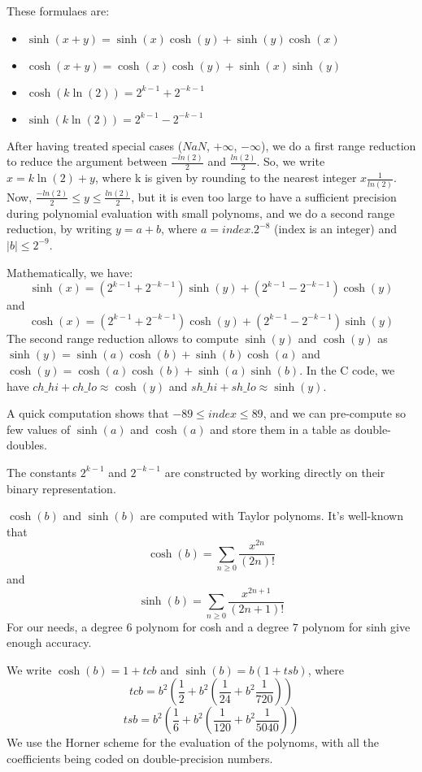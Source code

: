 These formulaes are:
\begin{itemize}
\item  $\sinh(x + y) = \sinh(x)  \cosh(y) + \sinh(y)  \cosh(x)$
\item  $\cosh(x + y) = \cosh(x)  \cosh(y) + \sinh(x)  \sinh(y)$
\item  $\cosh(k\ln(2)) = 2^{k-1} + 2^{-k-1}$
\item   $\sinh(k\ln(2)) = 2^{k-1} - 2^{-k-1}$
\end{itemize}



After having treated special cases ($NaN$, $+\infty$, $-\infty$), we
do a first range reduction to reduce the argument between
$\frac{-ln(2)}{2}$ and $\frac{ln(2)}{2}$.  So, we write $x = k\ln(2)
+ y$, where k is given by rounding to the nearest integer $x 
\frac{1}{ln(2)}$.  Now, $\frac{-ln(2)}{2} \leq y \leq
\frac{ln(2)}{2}$, but it is even too large to have a sufficient
precision during polynomial evaluation with small polynoms, and we do
a second range reduction, by writing $y = a + b$, where $a = index .
2^{-8}$ (index is an integer) and $|b| \leq 2^{-9}$.

Mathematically, we have: $$\sinh(x) = (2^{k-1} + 2^{-k-1})\sinh(y) +
(2^{k-1} - 2^{-k-1}) \cosh(y)$$
and $$\cosh(x) = (2^{k-1} +
2^{-k-1})\cosh(y) + (2^{k-1} - 2^{-k-1}) \sinh(y)$$
The second range
reduction allows to compute $\sinh(y)$ and $\cosh(y)$ as $\sinh(y) =
\sinh(a) \cosh(b) + \sinh(b) \cosh(a)$ and $\cosh(y) = \cosh(a) 
\cosh(b) + \sinh(a) \sinh(b)$. In the C code, we have $ch\_hi + ch\_lo
\approx \cosh(y)$ and $sh\_hi + sh\_lo \approx \sinh(y)$.

A quick computation shows that $-89 \leq index \leq 89$, and we can
pre-compute so few values of $\sinh(a)$ and $\cosh(a)$ and store them in
a table as double-doubles.


The constants $2^{k-1}$ and $2^{-k-1}$ are constructed by working
directly on their binary representation.


$\cosh(b)$ and $\sinh(b)$ are computed with Taylor polynoms. It's
well-known that $$\cosh(b) = \sum_{n \geq 0}{\frac{x^{2n}}{(2n)!}}$$
and $$\sinh(b) = \sum_{n \geq 0}{\frac{x^{2n+1}}{(2n+1)!}}$$
For our
needs, a degree $6$ polynom for cosh and a degree $7$ polynom for sinh
give enough accuracy.

We write $\cosh(b) = 1 + tcb$ and $\sinh(b) = b(1 + tsb)$, where
$$tcb = b^{2}  (\frac{1}{2} + b^{2}(\frac{1}{24} + b^{2} 
\frac{1}{720}))$$
$$tsb = b^{2} (\frac{1}{6} + b^{2} 
(\frac{1}{120} + b^{2}  \frac{1}{5040}))$$
We use the Horner
scheme  for the evaluation of the polynoms, with all the
coefficients being coded on double-precision numbers.

